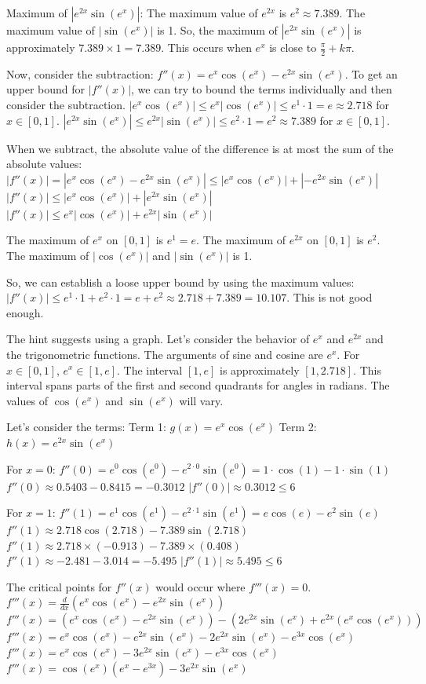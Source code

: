 \documentclass{article}
\begin{document}
Maximum of $|e^{2x} \sin(e^x)|$: The maximum value of $e^{2x}$ is $e^2 \approx 7.389$. The maximum value of $|\sin(e^x)|$ is 1. So, the maximum of $|e^{2x} \sin(e^x)|$ is approximately $7.389 \times 1 = 7.389$. This occurs when $e^x$ is close to $\frac{\pi}{2} + k\pi$.

Now, consider the subtraction: $f''(x) = e^x \cos(e^x) - e^{2x} \sin(e^x)$.
To get an upper bound for $|f''(x)|$, we can try to bound the terms individually and then consider the subtraction.
$|e^x \cos(e^x)| \leq e^x |\cos(e^x)| \leq e^1 \cdot 1 = e \approx 2.718$ for $x \in [0, 1]$.
$|e^{2x} \sin(e^x)| \leq e^{2x} |\sin(e^x)| \leq e^2 \cdot 1 = e^2 \approx 7.389$ for $x \in [0, 1]$.

When we subtract, the absolute value of the difference is at most the sum of the absolute values:
$|f''(x)| = |e^x \cos(e^x) - e^{2x} \sin(e^x)| \leq |e^x \cos(e^x)| + |-e^{2x} \sin(e^x)|$
$|f''(x)| \leq |e^x \cos(e^x)| + |e^{2x} \sin(e^x)|$
$|f''(x)| \leq e^x |\cos(e^x)| + e^{2x} |\sin(e^x)|$

The maximum of $e^x$ on $[0, 1]$ is $e^1 = e$.
The maximum of $e^{2x}$ on $[0, 1]$ is $e^2$.
The maximum of $|\cos(e^x)|$ and $|\sin(e^x)|$ is 1.

So, we can establish a loose upper bound by using the maximum values:
$|f''(x)| \leq e^1 \cdot 1 + e^2 \cdot 1 = e + e^2 \approx 2.718 + 7.389 = 10.107$. This is not good enough.

The hint suggests using a graph. Let's consider the behavior of $e^x$ and $e^{2x}$ and the trigonometric functions.
The arguments of sine and cosine are $e^x$. For $x \in [0, 1]$, $e^x \in [1, e]$. The interval $[1, e]$ is approximately $[1, 2.718]$.
This interval spans parts of the first and second quadrants for angles in radians.
The values of $\cos(e^x)$ and $\sin(e^x)$ will vary.

Let's consider the terms:
Term 1: $g(x) = e^x \cos(e^x)$
Term 2: $h(x) = e^{2x} \sin(e^x)$

For $x=0$:
$f''(0) = e^0 \cos(e^0) - e^{2 \cdot 0} \sin(e^0) = 1 \cdot \cos(1) - 1 \cdot \sin(1)$
$f''(0) \approx 0.5403 - 0.8415 = -0.3012$
$|f''(0)| \approx 0.3012 \leq 6$

For $x=1$:
$f''(1) = e^1 \cos(e^1) - e^{2 \cdot 1} \sin(e^1) = e \cos(e) - e^2 \sin(e)$
$f''(1) \approx 2.718 \cos(2.718) - 7.389 \sin(2.718)$
$f''(1) \approx 2.718 \times (-0.913) - 7.389 \times (0.408)$
$f''(1) \approx -2.481 - 3.014 = -5.495$
$|f''(1)| \approx 5.495 \leq 6$

The critical points for $f''(x)$ would occur where $f'''(x)=0$.
$f'''(x) = \frac{d}{dx}(e^x \cos(e^x) - e^{2x} \sin(e^x))$
$f'''(x) = (e^x \cos(e^x) - e^{2x} \sin(e^x)) - (2e^{2x} \sin(e^x) + e^{2x} (e^x \cos(e^x)))$
$f'''(x) = e^x \cos(e^x) - e^{2x} \sin(e^x) - 2e^{2x} \sin(e^x) - e^{3x} \cos(e^x)$
$f'''(x) = e^x \cos(e^x) - 3e^{2x} \sin(e^x) - e^{3x} \cos(e^x)$
$f'''(x) = \cos(e^x) (e^x - e^{3x}) - 3e^{2x} \sin(e^x)$
\end{document}
